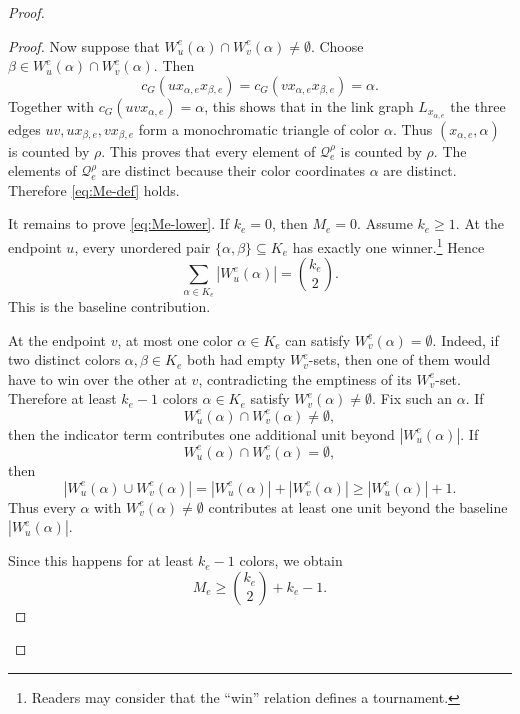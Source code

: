 \documentclass[10pt,a4paper]{article}
\theoremstyle{definition}
\begin{document}
\begin{proof}
\begin{proof}
        Now suppose that $W_u^e(\alpha)\cap W_v^e(\alpha)\neq\emptyset$.
        Choose $\beta\in W_u^e(\alpha)\cap W_v^e(\alpha)$.  Then
        \[
            c_G(ux_{\alpha,e}x_{\beta,e})
            =
            c_G(vx_{\alpha,e}x_{\beta,e})
            =
            \alpha.
        \]
        Together with $c_G(uvx_{\alpha,e})=\alpha$,
        this shows that in the link graph $L_{x_{\alpha,e}}$ the three edges $uv, ux_{\beta,e}, vx_{\beta,e}$ form a monochromatic triangle of color $\alpha$.
        Thus $(x_{\alpha,e},\alpha)$ is counted by $\rho$.
        This proves that every element of $\mathcal Q_e^\rho$ is counted by $\rho$.
        The elements of $\mathcal Q_e^\rho$ are distinct because their color coordinates
        $\alpha$ are distinct.  Therefore \eqref{eq:Me-def} holds.

        It remains to prove \eqref{eq:Me-lower}.  If $k_e=0$, then
        $M_e=0$.
        Assume $k_e\ge1$. At the endpoint $u$, every unordered pair
        $\{\alpha,\beta\}\subseteq K_e$ has exactly one winner.\footnote{Readers may consider that the ``win'' relation defines a tournament.}  Hence
        \[
            \sum_{\alpha\in K_e}|W_u^e(\alpha)|
            =
            \binom{k_e}{2}.
        \]
        This is the baseline contribution.

        At the endpoint $v$, at most one color $\alpha\in K_e$ can satisfy
        $W_v^e(\alpha)=\emptyset$.  Indeed, if two distinct colors
        $\alpha,\beta\in K_e$ both had empty $W_v^e$-sets, then one of them
        would have to win over the other at $v$, contradicting the emptiness
        of its $W_v^e$-set.  Therefore at least $k_e-1$ colors
        $\alpha\in K_e$ satisfy $W_v^e(\alpha)\neq\emptyset$.
        Fix such an $\alpha$.  If
        \[
            W_u^e(\alpha)\cap W_v^e(\alpha)\neq\emptyset,
        \]
        then the indicator term contributes one additional unit beyond
        $|W_u^e(\alpha)|$.  If
        \[
            W_u^e(\alpha)\cap W_v^e(\alpha)=\emptyset,
        \]
        then
        \[
            |W_u^e(\alpha)\cup W_v^e(\alpha)|
            =
            |W_u^e(\alpha)|+|W_v^e(\alpha)|
            \ge |W_u^e(\alpha)|+1.
        \]
        Thus every $\alpha$ with $W_v^e(\alpha)\neq\emptyset$ contributes at
        least one unit beyond the baseline $|W_u^e(\alpha)|$.

        Since this happens for at least $k_e-1$ colors, we obtain
        \[
            M_e
            \ge
            \binom{k_e}{2}+k_e-1.
        \]
    \end{proof}


\end{proof}
\end{document}
